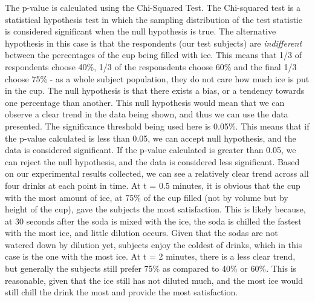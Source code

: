 \documentclass[oneside,12pt]{report}
\begin{document}
\vspace{12pt}
\newline
The p-value is calculated using the Chi-Squared Test. The Chi-squared test is a statistical hypothesis test in which the sampling distribution of the test statistic is considered significant when the null hypothesis is true. The alternative hypothesis in this case is that the respondents (our test subjects) are \emph{indifferent} between the percentages of the cup being filled with ice. This means that 1/3 of respondents choose 40\%, 1/3 of the responsdents choose 60\% and the final 1/3 choose 75\% - as a whole subject population, they do not care how much ice is put in the cup. The null hypothesis is that there exists a bias, or a tendency towards one percentage than another. This null hypothesis would mean that we can observe a clear trend in the data being shown, and thus we can use the data presented. 
\vspace{12pt}
\newline
The significance threshold being used here is 0.05\%. This means that if the p-value calculated is less than 0.05, we can accept null hypothesis, and the data is considered significant. If the p-value calculated is greater than 0.05, we can reject the null hypothesis, and the data is considered less significant. 
\vspace{12pt}
\newline
Based on our experimental results collected, we can see a relatively clear trend across all four drinks at each point in time. 
\vspace{12pt}
\newline
At t = 0.5 minutes, it is obvious that the cup with the most amount of ice, at 75\% of the cup filled (not by volume but by height of the cup), gave the subjects the most satisfaction. This is likely because, at 30 seconds after the soda is mixed with the ice, the soda is chilled the fastest with the most ice, and little dilution occurs. Given that the sodas are not watered down by dilution yet, subjects enjoy the coldest of drinks, which in this case is the one with the most ice. 
\vspace{12pt}
\newline
At t = 2 minutes, there is a less clear trend, but generally the subjects still prefer 75\% as compared to 40\% or 60\%. This is reasonable, given that the ice still has not diluted much, and the most ice would still chill the drink the most and provide the most satisfaction. 
\vspace{12pt}
\newline
\end{document}
